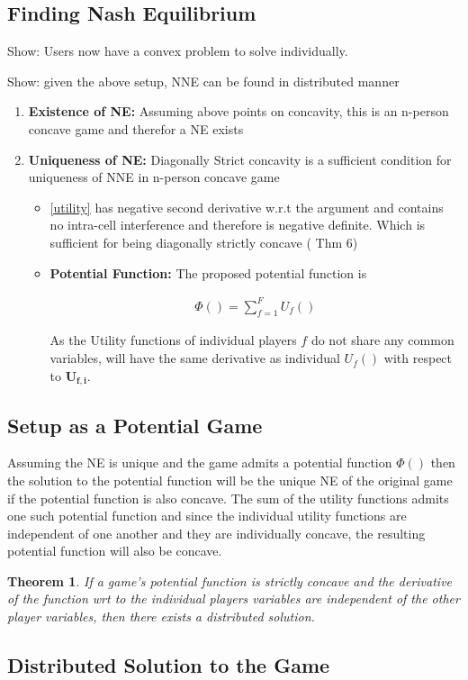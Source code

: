 \documentclass[12pt]{article}
\newtheorem{theorem}{Theorem}
\begin{document}
\subsection{Finding Nash Equilibrium}

Show: Users now have a convex problem to solve individually.

Show: given the above setup, NNE can be found in distributed manner


\begin{enumerate}
\item \textbf{Existence of NE:} Assuming above points on concavity, this is an n-person concave game and therefor a NE exists
\item \textbf{Uniqueness of NE:} Diagonally Strict concavity is a sufficient condition for uniqueness of NNE in n-person concave game
\begin{itemize}
\item\eqref{utility} has negative second derivative w.r.t the argument and contains no intra-cell interference and therefore is negative definite. Which is sufficient for being diagonally strictly concave
\cite[Thm6]{rosen1964existence} ( Thm 6)

\item \textbf{Potential Function:} The proposed potential function is 

\begin{gather*} \label{Potential_Function}
\Phi() = \sum_{f = 1}^{F} U_f() 
\end{gather*}


As the Utility functions of individual players $f$ do not share any common variables,  \label{Potential_Function} will have the same derivative as individual $U_f()$ with respect to $\mathbf{U_{f,i}} $. 


\end{itemize}

\end{enumerate}

\subsection{Setup as a Potential Game}
Assuming the NE is unique and the game admits a potential function $\Phi()$ then the solution to the potential function will be the unique NE of the original game if the potential function is also concave. 
The sum of the utility functions admits one such potential function and since the individual utility functions are independent of one another and they are individually concave, the resulting potential function will also be concave. 
\\
\begin{theorem}\label{distributed}
If a game's potential function is strictly concave and the derivative of the function wrt to the individual players variables are independent of the other player variables, then there exists a distributed solution.
\end{theorem}


\subsection{Distributed Solution to the Game}
\end{document}

